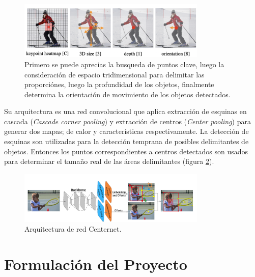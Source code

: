 \documentclass[letter,12pt]{report}
\begin{document}
\begin{figure}[ht]
    \centering
    \includegraphics[width=0.8\textwidth]{3dspace}
    \caption{Primero se puede aprecias la busqueda de puntos clave, luego la consideración
    de espacio tridimensional para delimitar las proporciónes, luego la profundidad de los
    objetos, finalmente determina la orientación de movimiento de los objetos detectados.}
    \label{fig:3dspace}
\end{figure}

Su arquitectura es una red convolucional que aplica extracción de esquinas en cascada (\textit{Cascade corner pooling}) y 
extracción de centros (\textit{Center pooling}) para generar dos mapas; de calor y características respectivamente. La detección
de esquinas son utilizadas para la detección temprana de posibles delimitantes de objetos. Entonces los puntos correspondientes a
centros detectados son usados para determinar el tamaño real de las áreas delimitantes (figura \ref{fig:arquitectureCenternet}).

\begin{figure}[ht]
    \centering
    \includegraphics[width=0.8\textwidth]{arquitectureCenternet}
    \caption{Arquitectura de red Centernet.}
    \label{fig:arquitectureCenternet}
\end{figure}


\chapter{Formulación del Proyecto}\label{formulación}
\end{document}
